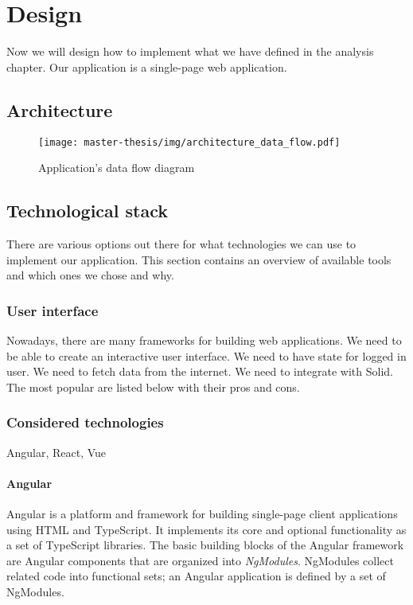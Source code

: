 \chapter{Design}
Now we will design how to implement what we have defined in the analysis chapter.
Our application is a single-page web application.

\section{Architecture}
\begin{figure}[h]
  \centering
  \texttt{[image: master-thesis/img/architecture\_data\_flow.pdf]}
  \caption{Application's data flow diagram}
\end{figure}

\section{Technological stack}
There are various options out there for what technologies we can use to implement our application.
This section contains an overview of available tools and which ones we chose and why.

\subsection{User interface}
Nowadays, there are many frameworks for building web applications.
We need to be able to create an interactive user interface.
We need to have state for logged in user.
We need to fetch data from the internet.
We need to integrate with Solid.
The most popular are listed below with their pros and cons.

\subsection*{Considered technologies}
Angular, React, Vue

\subsubsection*{Angular}
Angular is a platform and framework for building single-page client applications using HTML and TypeScript. 
It implements its core and optional functionality as a set of TypeScript libraries. 
The basic building blocks of the Angular framework are Angular components that are organized into \emph{NgModules}. 
NgModules collect related code into functional sets; an Angular application is defined by a set of NgModules.

